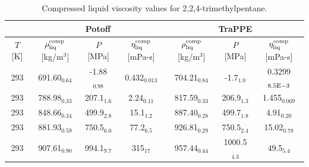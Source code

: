 \documentclass[preprint,review,11pt]{elsarticle}
\begin{document}
\begin{landscape}
		\begin{table}[H]
			\caption{Compressed liquid viscosity values for 2,2,4-trimethylpentane.}
			\begin{center}
				\begin{tabular}{|c|c|c|c|c|c|c|}
					\hline
					& \multicolumn{3}{c|}{Potoff}                                                                         & \multicolumn{3}{c|}{TraPPE}                                                                          \\ \hline
					$T$ {[}K{]} & $\rho^{\rm comp}_{\rm liq}$ {[}kg/m$^3${]} & $P$ {[}MPa{]}  & $\eta^{\rm comp}_{\rm liq}$ {[}mPa-s{]} & $\rho^{\rm comp}_{\rm liq}$ {[}kg/m$^3${]} & $P$ {[}MPa{]}  & $\eta^{\rm comp}_{\rm liq}$ {[}mPa-s{]} \\ \hline
					293         & 691.60$_{0.64}$                            & -1.88$_{0.98}$ & 0.432$_{0.013}$                        & 704.21$_{0.84}$                         & -1.7$_{1.0}$   & 0.3299$_{8.5 \rm E-3}$                      \\ \hline
					293         & 788.98$_{0.33}$                            & 207.1$_{1.6}$  & 2.24$_{0.11}$                          & 817.59$_{0.33}$                         & 206.9$_{1.3}$  & 1.455$_{0.069}$                        \\ \hline
					293         & 848.66$_{0.34}$                            & 499.9$_{2.8}$  & 15.1$_{1.2}$                           & 887.40$_{0.28}$                         & 499.7$_{1.8}$  & 4.91$_{0.20}$                          \\ \hline
					293         & 881.93$_{0.59}$                            & 750.5$_{6.0}$  & 77.2$_{6.5}$                           & 926.81$_{0.29}$                         & 750.5$_{2.4}$  & 15.02$_{0.78}$                         \\ \hline
					293         & 907.61$_{0.90}$	                         & 994.1$_{9.7}$  &	315$_{17}$                                      & 957.44$_{0.44}$                         & 1000.5$_{4.3}$ & 49.5$_{5.4}$                           \\ \hline
				\end{tabular}
			\end{center}
		\end{table}

\end{landscape}
\end{document}
